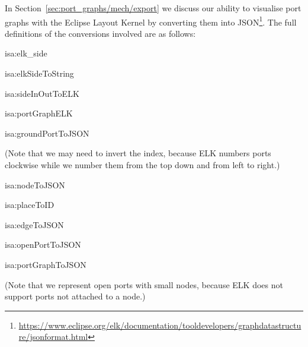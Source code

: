 \documentclass[class=smolathesis,crop=false]{standalone}
\begin{document}
In Section~\ref{sec:port_graphs/mech/export} we discuss our ability to visualise port graphs with the Eclipse Layout Kernel by converting them into JSON\footnote{\url{https://www.eclipse.org/elk/documentation/tooldevelopers/graphdatastructure/jsonformat.html}}.
The full definitions of the conversions involved are as follows:
\begin{isadef}{isa:elk_side}
  
\end{isadef}
\begin{isadef}{isa:elkSideToString}
  
\end{isadef}
\begin{isadef}{isa:sideInOutToELK}
  
\end{isadef}
\begin{isadef}{isa:portGraphELK}
  
\end{isadef}
\begin{isadef}{isa:groundPortToJSON}
  
\end{isadef}
\noindent(Note that we may need to invert the index, because ELK numbers ports clockwise while we number them from the top down and from left to right.)
\begin{isadef}{isa:nodeToJSON}
  
\end{isadef}
\begin{isadef}{isa:placeToID}
    
  \item
    
  \item
    
\end{isadef}
\begin{isadef}{isa:edgeToJSON}
  
\end{isadef}
\begin{isadef}{isa:openPortToJSON}
  
\end{isadef}
\begin{isadef}{isa:portGraphToJSON}
  
\end{isadef}
\noindent(Note that we represent open ports with small nodes, because ELK does not support ports not attached to a node.)
\end{document}
